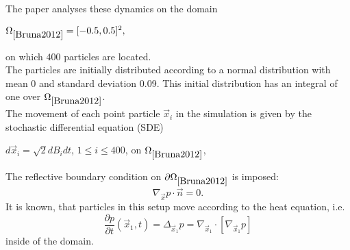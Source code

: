 The paper\cite{Bruna2012} analyses these dynamics on the domain 
\begin{center}
    $
    \Omega_{\cite{Bruna2012}} = [-0.5, 0.5]^2,
    $
\end{center}
on which $400$ particles are located. \\
The particles are initially distributed according to a normal distribution with mean 0 and standard deviation 0.09. 
This initial distribution has an integral of one over $\Omega_{\cite{Bruna2012}}$. \\
The movement of each point particle $\vec{x}_i$ in the simulation is given by the stochastic differential equation (SDE)
\begin{center}
    $d \vec{x}_i = \sqrt{2} d B_i dt$, \hspace{0.5em}
    $1 \leq i \leq 400$,\hspace{0.5em}
    on $ \Omega_{\cite{Bruna2012}}$, \\
\end{center}
The reflective boundary condition on $\partial \Omega_{\cite{Bruna2012}}$ is imposed:
\begin{equation}
    \nabla_{\vec{x}} p \cdot \vec{n} = 0.
\end{equation}
It is known, that particles in this setup move according to the heat equation, i.e.
\begin{equation}
    \frac{\partial p}{\partial t}(\vec{x}_1, t) = \Delta_{\vec{x}_1} p = \nabla_{\vec{x}_1} \cdot [ \nabla_{\vec{x}_1} p]
    \label{eq:heat}
\end{equation}
inside of the domain. \\

